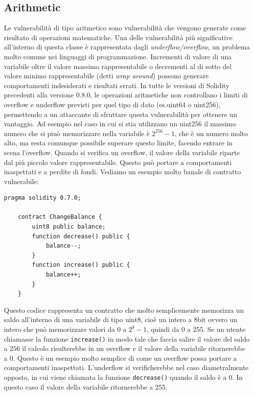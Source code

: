 \documentclass[../../Thesis.tex]{subfiles}
\begin{document}
\subsection{Arithmetic}
Le vulnerabilit\`a di tipo aritmetico \cite{sc-vulnerabilities} sono vulnerabilit\`a che vengono generate come risultato di operazioni matematiche. Una delle vulnerabilit\`a pi\`u significative all'interno di questa classe \`e rappresentata dagli \emph{underflow/overflow}, un problema molto comune nei linguaggi di programmazione. Incrementi di valore di una variabile oltre il valore massimo rappresentabile o decrementi al di sotto del valore minimo rappresentabile (detti \emph{wrap around}) possono generare comportamenti indesiderati e risultati errati. In tutte le versioni di Solidity precedenti alla versione 0.8.0, le operazioni aritmetiche non controllano i limiti di overflow e underflow previsti per quel tipo di dato (es.uint64 o uint256), permettendo a un attaccante di sfruttare questa vulnerabilit\`a per ottenere un vantaggio. Ad esempio nel caso in cui si stia utilizzano un uint256 il massimo numero che si piu\`o memorizzare nella variabile \`e $2^{256} - 1$, che \`e un numero molto alto, ma resta comunque possibile superare questo limite, facendo entrare in scena l'overflow. Quando si verifica un overflow, il valore della variabile riparte dal pi\`u piccolo valore rappresentabile. Questo pu\`o portare a comportamenti inaspettati e a perdite di fondi. Vediamo un esempio molto banale di contratto vulnerabile:
\begin{lstlisting}[language=Solidity]
    pragma solidity 0.7.0;

    contract ChangeBalance {
        uint8 public balance;
        function decrease() public {
            balance--;
        }
        function increase() public {
            balance++;
        }
    }
\end{lstlisting}
Questo codice rappresenta un contratto che molto semplicemente memorizza un saldo all'interno di una variabile di tipo uint8, cio\`e un intero a 8bit ovvero un intero che pu\`o memorizzare valori da 0 a $2^8-1$, quindi da 0 a 255. Se un utente chiamasse la funzione \texttt{increase()} in modo tale che faccia salire il valore del saldo a $256$ il calcolo risulterebbe in un overflow e il valore della variabile ritornerebbe a 0. Questo \`e un esempio molto semplice di come un overflow possa portare a comportamenti inaspettati. L'underflow si verificherebbe nel caso diametralmente opposto, in cui viene chiamata la funzione \texttt{decrease()} quando il saldo \`e a 0. In questo caso il valore della variabile ritornerebbe a 255.
\end{document}
